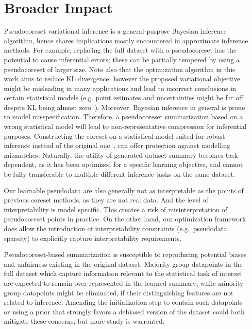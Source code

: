 \section*{ Broader Impact}
\label{sec:broader_impact}

Pseudocoreset variational inference is a general-purpose Bayesian inference
algorithm, hence shares implications mostly encountered in approximate
inference methods. For example, replacing the full dataset with a
pseudocoreset has the potential to cause inferential errors; these can be
partially tempered by using a pseudocoreset of larger size. Note also
that the optimization algorithm in this work aims to reduce 
KL divergence: however the proposed
variational objective might be misleading in many applications and lead to
incorrect conclusions in certain statistical models (e.g. point estimates and
uncertainties might be far off despite KL being almost zero~\citep{huggins20}).
 Moreover, Bayesian inference in general is prone to model misspecification.
Therefore, a pseudocoreset summarization based on a wrong statistical model
will lead to non-representative compression for inferential purposes.
Constructing the coreset on a statistical model suited for robust inference
instead of the original one~\citep{miller19, wang17}, can offer protection
against modelling mismatches. Naturally, the utility of generated dataset
summary becomes task-dependent, as it has been optimized for a specific
learning objective, and cannot be fully transferable to multiple different
inference tasks on the same dataset.

Our learnable pseudodata are also generally not as interpretable 
as the points of previous coreset methods, as they are not real data. And the level of 
interpretability is model specific. This creates a risk of misinterpretation
of pseudocoreset points in practice. On the other hand, our optimization framework
does allow the introduction of interpretability constraints (e.g.~pseudodata sparsity)
to explicitly capture interpretability requirements.

Pseudocoreset-based summarization is susceptible to reproducing potential
biases and unfairness existing in the original dataset. Majority-group datapoints in the full dataset which capture information relevant to the
statistical task of interest are expected to remain over-represented in the
learned summary; while minority-group datapoints might be eliminated, if their
distinguishing features are not related to inference. Amending the
initialization step to contain such datapoints or using a prior that
strongly favors a debiased version of the dataset could both mitigate these
concerns; but more study is warranted.
